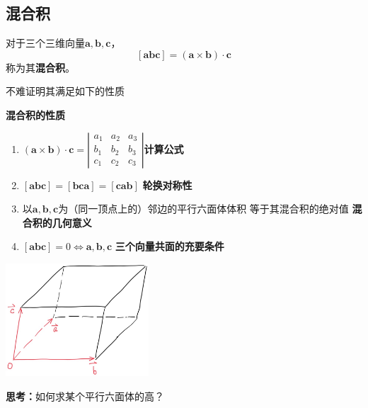 \subsection{混合积}

对于三个三维向量$\bm{a},\bm{b},\bm{c}$，
$$[\bm{abc}]=(\bm{a}\times\bm{b})\cdot\bm{c}$$
称为其{\bf 混合积}。

不难证明其满足如下的性质
\begin{thx}
	{\bf 混合积的性质}
	\begin{enumerate}%
	  \item $(\bm{a}\times\bm{b})\cdot\bm{c}=
	  \left|\begin{array}{ccc}
		a_1 & a_2 & a_3\\
		b_1 & b_2 & b_3\\
		c_1 & c_2 & c_3
		\end{array}\right|$\hfill{\bf 计算公式} 
	  \item $[\bm{abc}]=[\bm{bca}] =[\bm{cab}]$
	  \hfill {\bf 轮换对称性} 
	  \item 以$\bm{a},\bm{b},\bm{c}$为（同一顶点上的）邻边的平行六面体体积
	  等于其混合积的绝对值
	  \hfill {\bf 混合积的几何意义} 
	  \item $[\bm{abc}]=0\Leftrightarrow\bm{a},\bm{b},\bm{c}$
	  \hfill {\bf 三个向量共面的充要条件}
	\end{enumerate}
\end{thx}

\begin{center}
	\includegraphics[width=0.4\textwidth]{./images/ch8/tcp.jpg}
\end{center}

{\bf 思考：}如何求某个平行六面体的高？

